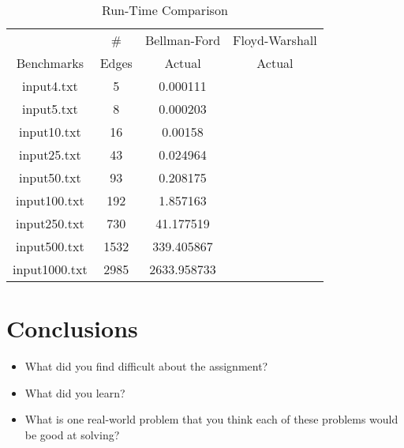 \documentclass[twocolumn]{article}
\begin{document}
\begin{table}
    \caption{Run-Time Comparison}
    \begin{tabular}{|c|c|c|c|}
        \hline
        &\#&Bellman-Ford&Floyd-Warshall\\
        Benchmarks &Edges&Actual&Actual\\
        \hline
        input4.txt   &   5& 0.000111&      \\
        input5.txt   &   8& 0.000203&      \\
        input10.txt  &  16& 0.00158&      \\
        input25.txt  &  43& 0.024964&      \\
        input50.txt  &  93& 0.208175&      \\
        input100.txt & 192& 1.857163&      \\
        input250.txt & 730& 41.177519&      \\
        input500.txt &1532& 339.405867&      \\
        input1000.txt&2985& 2633.958733&      \\
        \hline
    \end{tabular}
    \label{table::run-time}
\end{table}

\section{Conclusions}
\begin{itemize}
    \item What did you find difficult about the assignment?
    \item What did you learn?
    \item What is one real-world problem that you think each of these problems
    would be good at solving?
\end{itemize}
\end{document}
